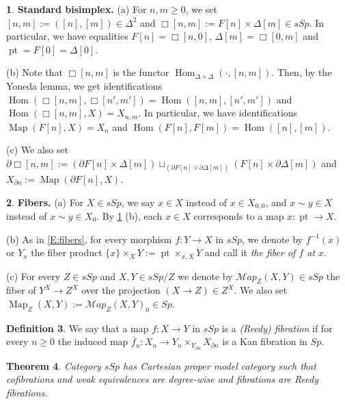 \documentclass[12pt]{amsart}
\theoremstyle{plain}
\newtheorem{Thm}{Theorem}[subsection]
\theoremstyle{definition}
\newtheorem{Def}[Thm]{Definition}
\newtheorem{Emp}[Thm]{}
\numberwithin{equation}{section}
\newcommand{\cal}[1]{\mathcal{#1}}
\newcommand{\C}[1]{\cal#1}
\newcommand{\Dt}{\Delta}
\newcommand{\re}[1]{\ref{E:#1}}
\newcommand{\Map}{\operatorname{Map}}
\newcommand{\pt}{\operatorname{pt}}
\newcommand{\p}{\partial}
\newcommand{\Hom}{\operatorname{Hom}}
\begin{document}
\begin{Emp} \label{E:stbis}
{\bf Standard bisimplex.} (a) For $n,m\geq 0$, we set
$[n,m]:=([n],[m])\in \Dt^2$ and $\Box[n,m]:=F[n]\times \Dt[m]\in
sSp$. In particular, we have equalities $F[n]=\Box[n,0]$, $\Dt[m]=\Box[0,m]$
and $\pt=F[0]=\Dt[0]$.  

(b) Note that $\Box[n,m]$ is the functor
$\Hom_{\Dt\times\Dt}(\cdot,[n,m])$. Then, by the Yoneda lemma, we get identifications 
$\Hom(\Box[n,m],\Box[n',m'])=\Hom([n,m],[n',m'])$ and 
$\Hom(\Box[n,m],X)=X_{n,m}$. In particular,
we have identifications \\ $\Map(F[n],X)=X_n$ and $\Hom(F[n],F[m])=\Hom([n],[m])$.

(c) We also set $\p\Box[n,m]:=(\p F[n]\times \Dt[m])\sqcup_{(\p
F[n]\times\p\Dt[m])}(F[n]\times\p\Dt[m])$ and \\ $X_{\p
n}:=\Map(\p F[n],X)$.
\end{Emp}

\begin{Emp} \label{E:fibers2}
{\bf Fibers.} (a) For  $X\in sSp$, we say $x\in X$ instead of $x\in
X_{0,0}$, and $x\sim y\in X$ instead of $x\sim y\in X_0$. By
\re{stbis} (b), each $x\in X$ corresponds to a map $x:\pt\to X$.

(b) As in \re{fibers}, for every morphism $f:Y\to X$ in $sSp$, we
denote by $f^{-1}(x)$ or $Y_x$ the fiber product $\{x\}\times_X
Y:=\pt\times_{x,X}Y$ and call it {\em the fiber of $f$ at $x$}.

(c) For every $Z\in sSp$ and $X,Y\in sSp/Z$ we denote by
$\C{Map}_Z(X,Y)\in sSp$ the fiber of $Y^X\to Z^X$ over the
projection $(X\to Z)\in Z^X$. We also set \\
$\Map_Z(X,Y):=\C{Map}_Z(X,Y)_0\in Sp$.

\end{Emp}


\begin{Def} \label{D:rfib}
We say that a map $f:X\to Y$ in $sSp$ is a {\em (Reedy) fibration}
if for every $n\geq 0$ the induced map $\bar{f}_n:X_n\to
Y_n\times_{Y_{\p n}}X_{\p n}$ is a Kan fibration in $Sp$.
\end{Def}

\begin{Thm} \label{T:Reedy}
Category $sSp$ has Cartesian proper model category such that
cofibrations and weak equivalences are degree-wise and fibrations
are Reedy fibrations.
\end{Thm}
\end{document}
